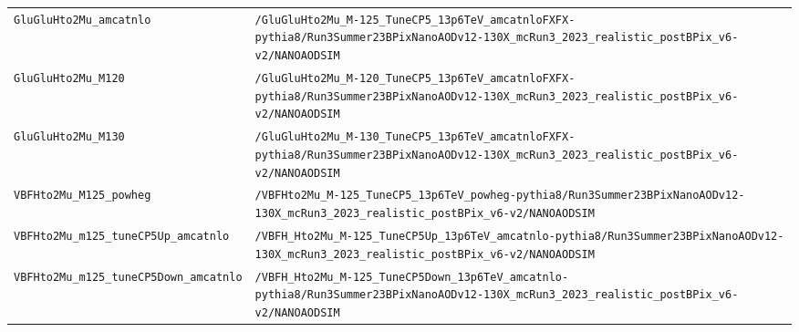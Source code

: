 \begin{longtable}{@{}>{\RaggedRight\arraybackslash}p{} >{\RaggedRight\arraybackslash}p{}@{}}
\addlinespace[2pt]
\texttt{GluGluHto2Mu\_\allowbreak{}amcatnlo} & \texttt{/\allowbreak{}GluGluHto2Mu\_\allowbreak{}M-\allowbreak{}125\_\allowbreak{}TuneCP5\_\allowbreak{}13p6TeV\_\allowbreak{}amcatnloFXFX-\allowbreak{}pythia8/\allowbreak{}Run3Summer23BPixNanoAODv12-\allowbreak{}130X\_\allowbreak{}mcRun3\_\allowbreak{}2023\_\allowbreak{}realistic\_\allowbreak{}postBPix\_\allowbreak{}v6-\allowbreak{}v2/\allowbreak{}NANOAODSIM} \\
\addlinespace[2pt]
\texttt{GluGluHto2Mu\_\allowbreak{}M120} & \texttt{/\allowbreak{}GluGluHto2Mu\_\allowbreak{}M-\allowbreak{}120\_\allowbreak{}TuneCP5\_\allowbreak{}13p6TeV\_\allowbreak{}amcatnloFXFX-\allowbreak{}pythia8/\allowbreak{}Run3Summer23BPixNanoAODv12-\allowbreak{}130X\_\allowbreak{}mcRun3\_\allowbreak{}2023\_\allowbreak{}realistic\_\allowbreak{}postBPix\_\allowbreak{}v6-\allowbreak{}v2/\allowbreak{}NANOAODSIM} \\
\addlinespace[2pt]
\texttt{GluGluHto2Mu\_\allowbreak{}M130} & \texttt{/\allowbreak{}GluGluHto2Mu\_\allowbreak{}M-\allowbreak{}130\_\allowbreak{}TuneCP5\_\allowbreak{}13p6TeV\_\allowbreak{}amcatnloFXFX-\allowbreak{}pythia8/\allowbreak{}Run3Summer23BPixNanoAODv12-\allowbreak{}130X\_\allowbreak{}mcRun3\_\allowbreak{}2023\_\allowbreak{}realistic\_\allowbreak{}postBPix\_\allowbreak{}v6-\allowbreak{}v2/\allowbreak{}NANOAODSIM} \\
\addlinespace[2pt]
\texttt{VBFHto2Mu\_\allowbreak{}M125\_\allowbreak{}powheg} & \texttt{/\allowbreak{}VBFHto2Mu\_\allowbreak{}M-\allowbreak{}125\_\allowbreak{}TuneCP5\_\allowbreak{}13p6TeV\_\allowbreak{}powheg-\allowbreak{}pythia8/\allowbreak{}Run3Summer23BPixNanoAODv12-\allowbreak{}130X\_\allowbreak{}mcRun3\_\allowbreak{}2023\_\allowbreak{}realistic\_\allowbreak{}postBPix\_\allowbreak{}v6-\allowbreak{}v2/\allowbreak{}NANOAODSIM} \\
\addlinespace[2pt]
\texttt{VBFHto2Mu\_\allowbreak{}m125\_\allowbreak{}tuneCP5Up\_\allowbreak{}amcatnlo} & \texttt{/\allowbreak{}VBFH\_\allowbreak{}Hto2Mu\_\allowbreak{}M-\allowbreak{}125\_\allowbreak{}TuneCP5Up\_\allowbreak{}13p6TeV\_\allowbreak{}amcatnlo-\allowbreak{}pythia8/\allowbreak{}Run3Summer23BPixNanoAODv12-\allowbreak{}130X\_\allowbreak{}mcRun3\_\allowbreak{}2023\_\allowbreak{}realistic\_\allowbreak{}postBPix\_\allowbreak{}v6-\allowbreak{}v2/\allowbreak{}NANOAODSIM} \\
\addlinespace[2pt]
\texttt{VBFHto2Mu\_\allowbreak{}m125\_\allowbreak{}tuneCP5Down\_\allowbreak{}amcatnlo} & \texttt{/\allowbreak{}VBFH\_\allowbreak{}Hto2Mu\_\allowbreak{}M-\allowbreak{}125\_\allowbreak{}TuneCP5Down\_\allowbreak{}13p6TeV\_\allowbreak{}amcatnlo-\allowbreak{}pythia8/\allowbreak{}Run3Summer23BPixNanoAODv12-\allowbreak{}130X\_\allowbreak{}mcRun3\_\allowbreak{}2023\_\allowbreak{}realistic\_\allowbreak{}postBPix\_\allowbreak{}v6-\allowbreak{}v2/\allowbreak{}NANOAODSIM} \\

\end{longtable}
